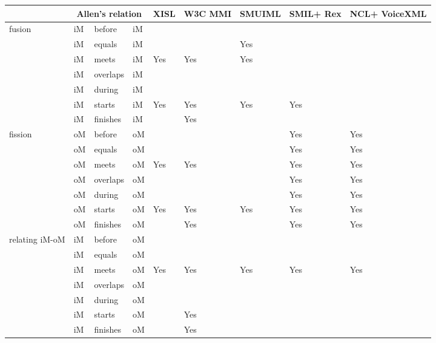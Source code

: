 \documentclass[
  doutorado,
  american
]{ThesisPUC}
\begin{document}
\begin{table}[!ht]
\scriptsize
\begin{tabular}{ m{1.8cm} m{0.5cm} m{1cm} m{0.5cm} m{1cm} m{1cm} 
m{1.5cm} m{1.5cm} m{1.5cm}}
	\hline
	& \multicolumn{3}{c}{\textbf{Allen’s relation}}
		& \textbf{XISL}	& \textbf{W3C MMI}	& \textbf{SMUIML}	& 
		\textbf{SMIL+} \newline \textbf{Rex}	& \textbf{NCL+} \newline 
		\textbf{VoiceXML} \\

	\hline
	\multirow{7}{*}{fusion} 
	& iM &	before &		iM & & & & & \\
	& iM &	equals &		iM & & & Yes & & \\
	& iM &	meets &			iM & Yes & Yes & Yes & &\\
	& iM &	overlaps &	iM & & & & & \\
	& iM &	during &		iM & & & & & \\
	& iM &	starts &		iM & Yes & Yes & Yes & Yes & \\
	& iM &	finishes &	iM & & Yes & & & \\
	\hline

	\multirow{7}{*}{fission}
	& oM &	before &		oM & & & & Yes & Yes \\
	& oM &	equals &		oM & & & & Yes & Yes \\
	& oM &	meets &			oM & Yes & Yes & & Yes & Yes \\
	& oM &	overlaps &	oM & & & & Yes & Yes \\
	& oM &	during &		oM & & & & Yes & Yes \\
	& oM &	starts &		oM & Yes & Yes & Yes & Yes & Yes \\
	& oM &	finishes &	oM & & Yes & & Yes & Yes \\
	\hline

	\multirow{7}{*}{relating iM-oM}
	& iM &	before &		oM & & & & & \\
	& iM &	equals &		oM & & & & & \\
	& iM &	meets &			oM & Yes & Yes & Yes & Yes & Yes \\
	& iM &	overlaps &	oM & & & & & \\
	& iM &	during &		oM & & & & & \\
	& iM &	starts &		oM & & Yes & & & \\
	& iM &	finishes &	oM & & Yes & & & \\
	\hline


\end{tabular}
\end{table}
\end{document}
